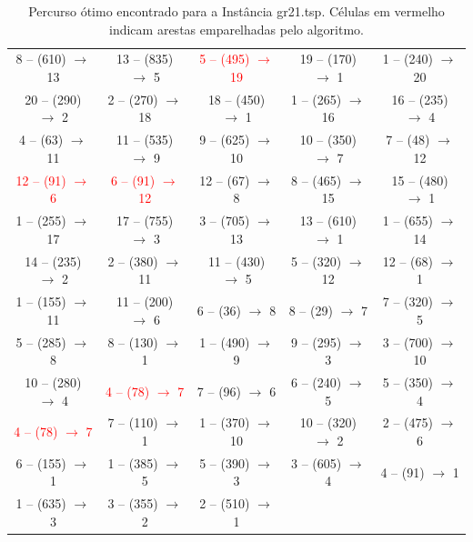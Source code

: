 \begin{table}[H]
\begin{tabular}{|c|c|c|c|c|}
    8 -- (610) $\rightarrow$ 13 & 13 -- (835) $\rightarrow$ 5 & \textcolor{red}{5 -- (495) $\rightarrow$ 19} & 19 -- (170) $\rightarrow$ 1 & 1 -- (240) $\rightarrow$ 20 \\
    20 -- (290) $\rightarrow$ 2 & 2 -- (270) $\rightarrow$ 18 & 18 -- (450) $\rightarrow$ 1 & 1 -- (265) $\rightarrow$ 16 & 16 -- (235) $\rightarrow$ 4 \\
    4 -- (63) $\rightarrow$ 11 & 11 -- (535) $\rightarrow$ 9 & 9 -- (625) $\rightarrow$ 10 & 10 -- (350) $\rightarrow$ 7 & 7 -- (48) $\rightarrow$ 12 \\
    \textcolor{red}{12 -- (91) $\rightarrow$ 6} & \textcolor{red}{6 -- (91) $\rightarrow$ 12} & 12 -- (67) $\rightarrow$ 8 & 8 -- (465) $\rightarrow$ 15 & 15 -- (480) $\rightarrow$ 1 \\
    1 -- (255) $\rightarrow$ 17 & 17 -- (755) $\rightarrow$ 3 & 3 -- (705) $\rightarrow$ 13 & 13 -- (610) $\rightarrow$ 1 & 1 -- (655) $\rightarrow$ 14 \\
    14 -- (235) $\rightarrow$ 2 & 2 -- (380) $\rightarrow$ 11 & 11 -- (430) $\rightarrow$ 5 & 5 -- (320) $\rightarrow$ 12 & 12 -- (68) $\rightarrow$ 1 \\
    1 -- (155) $\rightarrow$ 11 & 11 -- (200) $\rightarrow$ 6 & 6 -- (36) $\rightarrow$ 8 & 8 -- (29) $\rightarrow$ 7 & 7 -- (320) $\rightarrow$ 5 \\
    5 -- (285) $\rightarrow$ 8 & 8 -- (130) $\rightarrow$ 1 & 1 -- (490) $\rightarrow$ 9 & 9 -- (295) $\rightarrow$ 3 & 3 -- (700) $\rightarrow$ 10 \\
    10 -- (280) $\rightarrow$ 4 & \textcolor{red}{4 -- (78) $\rightarrow$ 7} & 7 -- (96) $\rightarrow$ 6 & 6 -- (240) $\rightarrow$ 5 & 5 -- (350) $\rightarrow$ 4 \\
    \textcolor{red}{4 -- (78) $\rightarrow$ 7} & 7 -- (110) $\rightarrow$ 1 & 1 -- (370) $\rightarrow$ 10 & 10 -- (320) $\rightarrow$ 2 & 2 -- (475) $\rightarrow$ 6 \\
    6 -- (155) $\rightarrow$ 1 & 1 -- (385) $\rightarrow$ 5 & 5 -- (390) $\rightarrow$ 3 & 3 -- (605) $\rightarrow$ 4 & 4 -- (91) $\rightarrow$ 1 \\
    1 -- (635) $\rightarrow$ 3 & 3 -- (355) $\rightarrow$ 2 & 2 -- (510) $\rightarrow$ 1 &   &   \\
        \hline
    \end{tabular}
    \caption{Percurso ótimo encontrado para a Instância gr21.tsp. Células em vermelho indicam arestas emparelhadas pelo algoritmo.}
    \label{tab:percurso_gr21}
\end{table}
